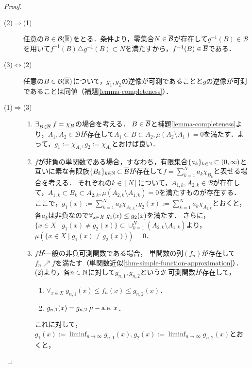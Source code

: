 \documentclass[uplatex, dvipdfmx]{jsreport}
\renewcommand{\B}{\mathcal{B}}
\begin{document}
\begin{proof}\mbox{}
    \begin{description}
        \item[(2)$\Rightarrow$(1)] 任意の$B\in\B(\o{\R})$をとる．条件より，零集合$N\in\o{\B}$が存在して$g^{-1}(B)\in\B$を用いて$f^{-1}(B)\triangle g^{-1}(B)\subset N$を満たすから，$f^{-1}(B)\in\o{\B}$である．
        \item[(3)$\Leftrightarrow$(2)] 任意の$B\in\B(\o{\R})$について，$g_1,g_2$の逆像が可測であることと$g$の逆像が可測であることは同値（補題\ref{lemma-completeness}）．
        \item[(1)$\Rightarrow$(3)] \begin{enumerate}
            \item $\exists_{B\in\o{\B}}\;f=\chi_B$の場合を考える．
            $B\in\o{\B}$と補題\ref{lemma-completeness}より，$A_1,A_2\in\B$が存在して$A_1\subset B\subset A_2,\mu(A_2\setminus A_1)=0$を満たす．よって，$g_1:=\chi_{A_1},g_2:=\chi_{A_2}$とおけば良い．
            \item $f$が非負の単関数である場合，すなわち，有限集合$\{a_k\}_{k\in\mathbb{N}}\subset(0,\infty)$と互いに素な有限族$\{B_k\}_{k\in\N}\subset\o{\B}$が存在して$f=\sum^N_{k=1}a_k\chi_{B_k}$と表せる場合を考える．
            それぞれの$k\in[N]$について，$A_{1,k},A_{2,k}\in\B$が存在して，$A_{1,k}\subset B_k\subset A_{2,k},\mu(A_{2,k}\setminus A_{1,k})=0$を満たすものが存在する．
            ここで，$g_1(x):=\sum^N_{k=1}a_k\chi_{A_{1,k}},g_2(x):=\sum^N_{k=1}a_k\chi_{A_{2,k}}$とおくと，各$a_k$は非負なので$\forall_{x\in\mathcal{X}}\;g_1(x)\le g_2(x)$を満たす．
            さらに，$\{x\in X\mid g_1(x)\ne g_2(x)\}\subset\cup^N_{k=1}(A_{2,k}\setminus A_{1,k})$より，$\mu(\{x\in X\mid g_1(x)\ne g_2(x)\})=0$．
            \item $f$が一般の非負可測関数である場合，
            単関数の列$(f_n)$が存在して$f_n\nearrow f$を満たす（単関数近似\ref{thm-simple-function-approximation}）．
            (2)より，各$n\in\mathbb{N}$に対して$g_{n,1},g_{n,2}$という$\B$-可測関数が存在して，
            \begin{enumerate}
                \item $\forall_{x\in X}\;g_{n,1}(x)\le f_n(x)\le g_{n,2}(x)$．
                \item $g_{n,1}(x)=g_{n,2}\;\mu-\mathrm{a.e.}\; x$．
            \end{enumerate}
            これに対して，$g_1(x):=\liminf_{n\to\infty}g_{n,1}(x),g_2(x):=\liminf_{n\to\infty}g_{n,2}(x)$とおくと，
            \begin{enumerate}

\end{enumerate}
\end{enumerate}
\end{description}
\end{proof}
\end{document}
